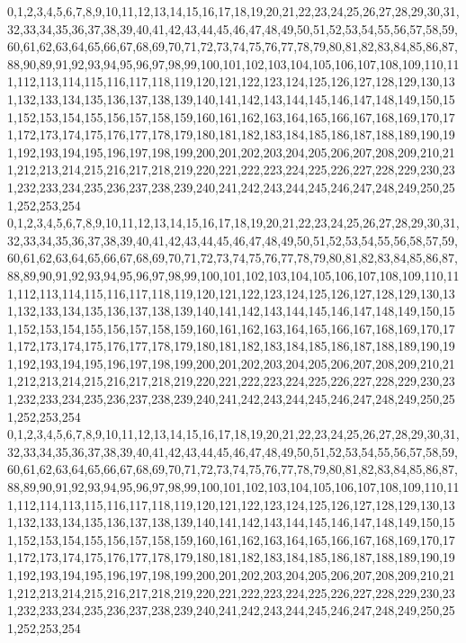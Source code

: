 \documentclass[12pt]{article}
\begin{document}
{0,1,2,3,4,5,6,7,8,9,10,11,12,13,14,15,16,17,18,19,20,21,22,23,24,25,26,27,28,29,30,31,32,33,34,35,36,37,38,39,40,41,42,43,44,45,46,47,48,49,50,51,52,53,54,55,56,57,58,59,60,61,62,63,64,65,66,67,68,69,70,71,72,73,74,75,76,77,78,79,80,81,82,83,84,85,86,87,88,90,89,91,92,93,94,95,96,97,98,99,100,101,102,103,104,105,106,107,108,109,110,111,112,113,114,115,116,117,118,119,120,121,122,123,124,125,126,127,128,129,130,131,132,133,134,135,136,137,138,139,140,141,142,143,144,145,146,147,148,149,150,151,152,153,154,155,156,157,158,159,160,161,162,163,164,165,166,167,168,169,170,171,172,173,174,175,176,177,178,179,180,181,182,183,184,185,186,187,188,189,190,191,192,193,194,195,196,197,198,199,200,201,202,203,204,205,206,207,208,209,210,211,212,213,214,215,216,217,218,219,220,221,222,223,224,225,226,227,228,229,230,231,232,233,234,235,236,237,238,239,240,241,242,243,244,245,246,247,248,249,250,251,252,253,254\\
0,1,2,3,4,5,6,7,8,9,10,11,12,13,14,15,16,17,18,19,20,21,22,23,24,25,26,27,28,29,30,31,32,33,34,35,36,37,38,39,40,41,42,43,44,45,46,47,48,49,50,51,52,53,54,55,56,58,57,59,60,61,62,63,64,65,66,67,68,69,70,71,72,73,74,75,76,77,78,79,80,81,82,83,84,85,86,87,88,89,90,91,92,93,94,95,96,97,98,99,100,101,102,103,104,105,106,107,108,109,110,111,112,113,114,115,116,117,118,119,120,121,122,123,124,125,126,127,128,129,130,131,132,133,134,135,136,137,138,139,140,141,142,143,144,145,146,147,148,149,150,151,152,153,154,155,156,157,158,159,160,161,162,163,164,165,166,167,168,169,170,171,172,173,174,175,176,177,178,179,180,181,182,183,184,185,186,187,188,189,190,191,192,193,194,195,196,197,198,199,200,201,202,203,204,205,206,207,208,209,210,211,212,213,214,215,216,217,218,219,220,221,222,223,224,225,226,227,228,229,230,231,232,233,234,235,236,237,238,239,240,241,242,243,244,245,246,247,248,249,250,251,252,253,254\\
0,1,2,3,4,5,6,7,8,9,10,11,12,13,14,15,16,17,18,19,20,21,22,23,24,25,26,27,28,29,30,31,32,33,34,35,36,37,38,39,40,41,42,43,44,45,46,47,48,49,50,51,52,53,54,55,56,57,58,59,60,61,62,63,64,65,66,67,68,69,70,71,72,73,74,75,76,77,78,79,80,81,82,83,84,85,86,87,88,89,90,91,92,93,94,95,96,97,98,99,100,101,102,103,104,105,106,107,108,109,110,111,112,114,113,115,116,117,118,119,120,121,122,123,124,125,126,127,128,129,130,131,132,133,134,135,136,137,138,139,140,141,142,143,144,145,146,147,148,149,150,151,152,153,154,155,156,157,158,159,160,161,162,163,164,165,166,167,168,169,170,171,172,173,174,175,176,177,178,179,180,181,182,183,184,185,186,187,188,189,190,191,192,193,194,195,196,197,198,199,200,201,202,203,204,205,206,207,208,209,210,211,212,213,214,215,216,217,218,219,220,221,222,223,224,225,226,227,228,229,230,231,232,233,234,235,236,237,238,239,240,241,242,243,244,245,246,247,248,249,250,251,252,253,254\\
}
\end{document}
